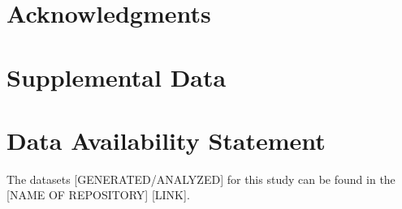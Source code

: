\documentclass[utf8]{frontiersSCNS} %
\begin{document}
\section*{Acknowledgments}

\section*{Supplemental Data}

\section*{Data Availability Statement}
The datasets [GENERATED/ANALYZED] for this study can be found in the [NAME OF REPOSITORY] [LINK].



\end{document}
